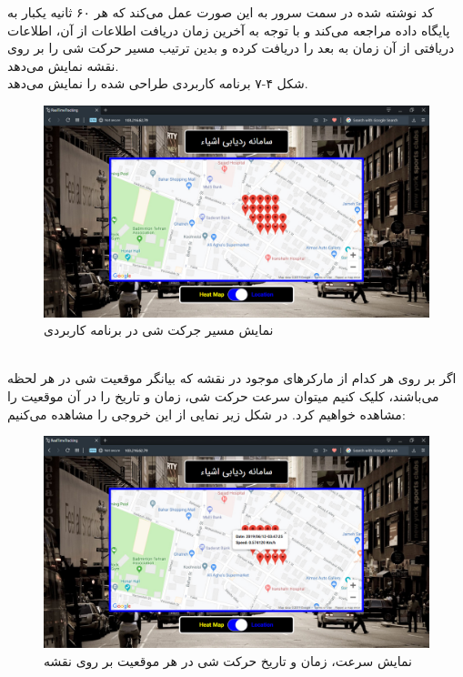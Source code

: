 کد نوشته شده در سمت سرور به این صورت عمل می‌کند که هر ۶۰ ثانیه یکبار به پایگاه داده مراجعه می‌کند و با توجه به آخرین زمان دریافت اطلاعات از آن، اطلاعات دریافتی از  آن زمان به بعد را دریافت کرده و بدین ترتیب مسیر حرکت شی را بر روی نقشه نمایش می‌دهد.\\
شکل ۴-۷ برنامه کاربردی طراحی شده را نمایش می‌دهد.
\\
 \begin{figure}[!h]
 	\centerline{\includegraphics[width=.9\textwidth]{webapp3}}
 	\caption{نمایش مسیر جرکت شی در برنامه کاربردی}
 \end{figure}
\\
 اگر بر روی هر کدام از مارکرهای موجود در نقشه که بیانگر موقعیت شی در هر لحظه می‌باشند، کلیک کنیم میتوان سرعت حرکت شی، زمان و تاریخ را در آن موقعیت را مشاهده خواهیم کرد. در شکل زیر نمایی از این خروجی را مشاهده می‌کنیم:
  \begin{figure}[!h]
 	\centerline{\includegraphics[width=.9\textwidth]{webapp4}}
 	\caption{نمایش سرعت، زمان و تاریخ حرکت شی در هر موقعیت بر روی نقشه}
 \end{figure}
